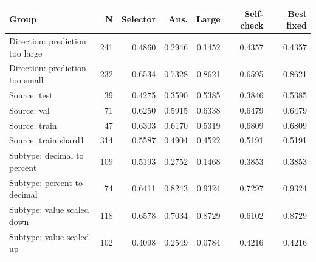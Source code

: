 \begin{tabular}{lrrrrrr}
\toprule
Group & N & Selector & Ans. & Large & Self-check & Best fixed \\
\midrule
Direction: prediction too large & 241 & 0.4860 & 0.2946 & 0.1452 & 0.4357 & 0.4357 \\
Direction: prediction too small & 232 & 0.6534 & 0.7328 & 0.8621 & 0.6595 & 0.8621 \\
Source: test & 39 & 0.4275 & 0.3590 & 0.5385 & 0.3846 & 0.5385 \\
Source: val & 71 & 0.6250 & 0.5915 & 0.6338 & 0.6479 & 0.6479 \\
Source: train & 47 & 0.6303 & 0.6170 & 0.5319 & 0.6809 & 0.6809 \\
Source: train shard1 & 314 & 0.5587 & 0.4904 & 0.4522 & 0.5191 & 0.5191 \\
Subtype: decimal to percent & 109 & 0.5193 & 0.2752 & 0.1468 & 0.3853 & 0.3853 \\
Subtype: percent to decimal & 74 & 0.6411 & 0.8243 & 0.9324 & 0.7297 & 0.9324 \\
Subtype: value scaled down & 118 & 0.6578 & 0.7034 & 0.8729 & 0.6102 & 0.8729 \\
Subtype: value scaled up & 102 & 0.4098 & 0.2549 & 0.0784 & 0.4216 & 0.4216 \\
\bottomrule
\end{tabular}

